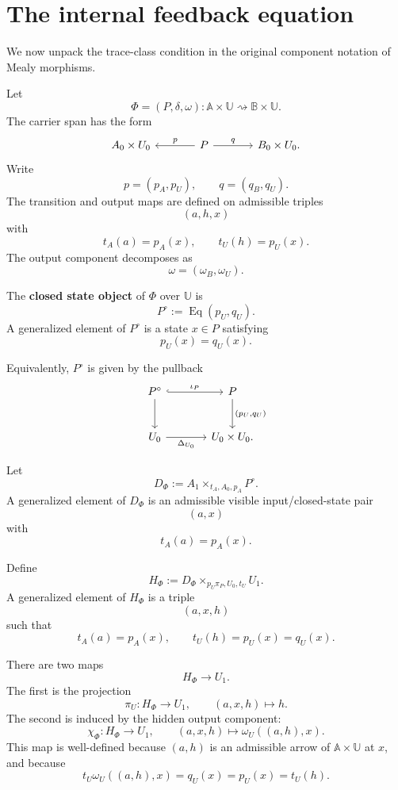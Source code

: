 \section{The internal feedback equation}
\label{sec:internal-feedback-equation}

We now unpack the trace-class condition in the original component notation of
Mealy morphisms.

Let
\[
\Phi=(P,\delta,\omega):
\mathbb A\times\mathbb U
\rightsquigarrow
\mathbb B\times\mathbb U.
\]
The carrier span has the form
\[
\begin{tikzcd}[column sep=large]
A_0\times U_0
&
P
  \arrow[l, "p"']
  \arrow[r, "q"]
&
B_0\times U_0 .
\end{tikzcd}
\]
Write
\[
p=(p_A,p_U),
\qquad
q=(q_B,q_U).
\]
The transition and output maps are defined on admissible triples
\[
(a,h,x)
\]
with
\[
t_A(a)=p_A(x),
\qquad
t_U(h)=p_U(x).
\]
The output component decomposes as
\[
\omega=(\omega_B,\omega_U).
\]

\begin{definition}
\label{def:closed-state-object}
The \textbf{closed state object} of \(\Phi\) over \(\mathbb U\) is
\[
P^\circ:=\operatorname{Eq}(p_U,q_U).
\]
A generalized element of \(P^\circ\) is a state \(x\in P\) satisfying
\[
p_U(x)=q_U(x).
\]
\end{definition}

Equivalently, \(P^\circ\) is given by the pullback
\[
\begin{tikzcd}[column sep=large,row sep=large]
P^\circ
  \arrow[r, hook, "\iota_P"]
  \arrow[d]
&
P
  \arrow[d, "{(p_U,q_U)}"]
\\
U_0
  \arrow[r, "\Delta_{U_0}"']
&
U_0\times U_0 .
\end{tikzcd}
\]

Let
\[
D_\Phi
:=
A_1\times_{t_A,A_0,p_A}P^\circ.
\]
A generalized element of \(D_\Phi\) is an admissible visible input/closed-state
pair
\[
(a,x)
\]
with
\[
t_A(a)=p_A(x).
\]

Define
\[
H_\Phi
:=
D_\Phi\times_{p_U\pi_P,U_0,t_U}U_1.
\]
A generalized element of \(H_\Phi\) is a triple
\[
(a,x,h)
\]
such that
\[
t_A(a)=p_A(x),
\qquad
t_U(h)=p_U(x)=q_U(x).
\]

There are two maps
\[
H_\Phi\to U_1.
\]
The first is the projection
\[
\pi_U:H_\Phi\to U_1,
\qquad
(a,x,h)\longmapsto h.
\]
The second is induced by the hidden output component:
\[
\chi_\Phi:H_\Phi\to U_1,
\qquad
(a,x,h)\longmapsto\omega_U((a,h),x).
\]
This map is well-defined because \((a,h)\) is an admissible arrow of
\(\mathbb A\times\mathbb U\) at \(x\), and because
\[
t_U\omega_U((a,h),x)=q_U(x)=p_U(x)=t_U(h).
\]

